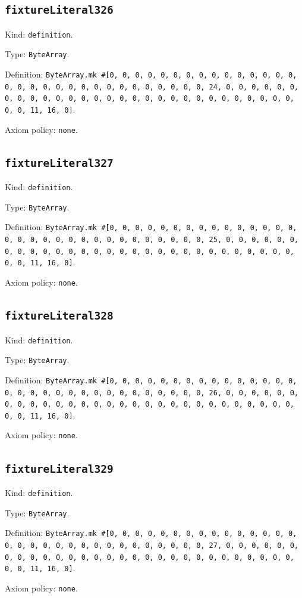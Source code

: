 \documentclass[11pt]{article}
\begin{document}
\subsection*{\texttt{fixtureLiteral326}}
\noindent Kind: \texttt{definition}.\par
\noindent Type: \texttt{ByteArray}.\par
\noindent Definition: \texttt{ByteArray.mk \#[0, 0, 0, 0, 0, 0, 0, 0, 0, 0, 0, 0, 0, 0, 0, 0, 0, 0, 0, 0, 0, 0, 0, 0, 0, 0, 0, 0, 0, 0, 0, 24, 0, 0, 0, 0, 0, 0, 0, 0, 0, 0, 0, 0, 0, 0, 0, 0, 0, 0, 0, 0, 0, 0, 0, 0, 0, 0, 0, 0, 0, 0, 0, 11, 16, 0]}.\par
\noindent Axiom policy: \texttt{none}.\par
\subsection*{\texttt{fixtureLiteral327}}
\noindent Kind: \texttt{definition}.\par
\noindent Type: \texttt{ByteArray}.\par
\noindent Definition: \texttt{ByteArray.mk \#[0, 0, 0, 0, 0, 0, 0, 0, 0, 0, 0, 0, 0, 0, 0, 0, 0, 0, 0, 0, 0, 0, 0, 0, 0, 0, 0, 0, 0, 0, 0, 25, 0, 0, 0, 0, 0, 0, 0, 0, 0, 0, 0, 0, 0, 0, 0, 0, 0, 0, 0, 0, 0, 0, 0, 0, 0, 0, 0, 0, 0, 0, 0, 11, 16, 0]}.\par
\noindent Axiom policy: \texttt{none}.\par
\subsection*{\texttt{fixtureLiteral328}}
\noindent Kind: \texttt{definition}.\par
\noindent Type: \texttt{ByteArray}.\par
\noindent Definition: \texttt{ByteArray.mk \#[0, 0, 0, 0, 0, 0, 0, 0, 0, 0, 0, 0, 0, 0, 0, 0, 0, 0, 0, 0, 0, 0, 0, 0, 0, 0, 0, 0, 0, 0, 0, 26, 0, 0, 0, 0, 0, 0, 0, 0, 0, 0, 0, 0, 0, 0, 0, 0, 0, 0, 0, 0, 0, 0, 0, 0, 0, 0, 0, 0, 0, 0, 0, 11, 16, 0]}.\par
\noindent Axiom policy: \texttt{none}.\par
\subsection*{\texttt{fixtureLiteral329}}
\noindent Kind: \texttt{definition}.\par
\noindent Type: \texttt{ByteArray}.\par
\noindent Definition: \texttt{ByteArray.mk \#[0, 0, 0, 0, 0, 0, 0, 0, 0, 0, 0, 0, 0, 0, 0, 0, 0, 0, 0, 0, 0, 0, 0, 0, 0, 0, 0, 0, 0, 0, 0, 27, 0, 0, 0, 0, 0, 0, 0, 0, 0, 0, 0, 0, 0, 0, 0, 0, 0, 0, 0, 0, 0, 0, 0, 0, 0, 0, 0, 0, 0, 0, 0, 11, 16, 0]}.\par
\noindent Axiom policy: \texttt{none}.\par
\end{document}
